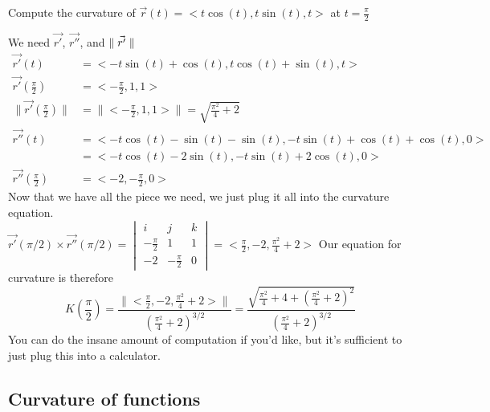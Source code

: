 \documentclass[12 pt]{article}
\begin{document}
        \begin{exmp*}
            Compute the curvature of $\vec{r}(t)=<t\cos(t),t\sin(t),t>$ at $t=\frac{\pi}{2}$

            We need $\vec{r'}$, $\vec{r''}$, and $\parallel \vec{r'} \parallel$
            \begin{align*}
                \vec{r'}(t)&=<-t\sin(t)+\cos(t),t\cos(t)+\sin(t),t>\\
                \vec{r'}(\frac{\pi}{2})&=<-\frac{\pi}{2},1,1>\\
                \parallel\vec{r'}(\frac{\pi}{2})\parallel&=\parallel<-\frac{\pi}{2},1,1>\parallel=\sqrt{\frac{\pi^2}{4}+2}\\
                \vec{r''}(t)&=<-t\cos(t)-\sin(t)-\sin(t),-t\sin(t)+\cos(t)+\cos(t),0>\\
                &=<-t\cos(t)-2\sin(t),-t\sin(t)+2\cos(t),0>\\
                \vec{r''}(\frac{\pi}{2})&=<-2,-\frac{\pi}{2},0>
            \end{align*}
            Now that we have all the piece we need, we just plug it all into the curvature equation.\\
            $\vec{r'}(\pi/2)\times\vec{r''}(\pi/2)=
            \begin{vmatrix}
                i & j & k \\
                -\frac{\pi}{2} & 1 & 1 \\
                -2 & -\frac{\pi}{2} & 0
            \end{vmatrix}
            =<\frac{\pi}{2},-2,\frac{\pi^2}{4}+2>$
            Our equation for curvature is therefore
            $$K(\frac{\pi}{2})=\frac{\parallel<\frac{\pi}{2},-2,\frac{\pi^2}{4}+2>\parallel}{(\frac{\pi^2}{4}+2)^{3/2}}=\frac{\sqrt{\frac{\pi^2}{4}+4+(\frac{\pi^2}{4}+2)^2}}{(\frac{\pi^2}{4}+2)^{3/2}}$$
            You can do the insane amount of computation if you'd like, but it's sufficient to just plug this into a calculator.
        \end{exmp*}

        \subsection{Curvature of functions}
\end{document}

